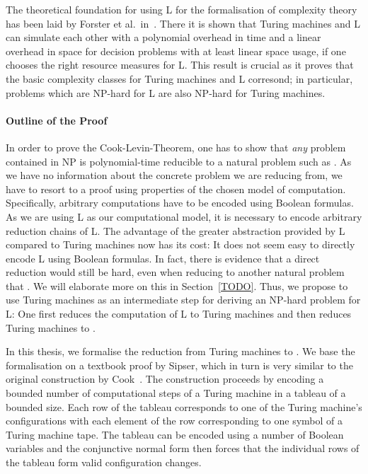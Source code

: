 The theoretical foundation for using L for the formalisation of complexity theory has been laid by Forster et al.\ in~\cite{TODO}. There it is shown that Turing machines and L can simulate each other with a polynomial overhead in time and a linear overhead in space for decision problems with at least linear space usage, if one chooses the right resource measures for L.
This result is crucial as it proves that the basic complexity classes for Turing machines and L corresond; in particular, problems which are NP-hard for L are also NP-hard for Turing machines.

\paragraph{Outline of the Proof}
In order to prove the Cook-Levin-Theorem, one has to show that \emph{any} problem contained in NP is polynomial-time reducible to a natural problem such as \SAT{}. 
As we have no information about the concrete problem we are reducing from, we have to resort to a proof using properties of the chosen model of computation. 
Specifically, arbitrary computations have to be encoded using Boolean formulas.
As we are using L as our computational model, it is necessary to encode arbitrary reduction chains of L. The advantage of the greater abstraction provided by L compared to Turing machines now has its cost: It does not seem easy to directly encode L using Boolean formulas. In fact, there is evidence that a direct reduction would still be hard, even when reducing to another natural problem that \SAT{}. We will elaborate more on this in Section~\ref{TODO}.
Thus, we propose to use Turing machines as an intermediate step for deriving an NP-hard problem for L: One first reduces the computation of L to Turing machines and then reduces Turing machines to \SAT{}. 

In this thesis, we formalise the reduction from Turing machines to \SAT{}. We base the formalisation on a textbook proof by Sipser\cite{TODO}, which in turn is very similar to the original construction by Cook~\cite{TODO}. The construction proceeds by encoding a bounded number of computational steps of a Turing machine in a tableau of a bounded size. Each row of the tableau corresponds to one of the Turing machine's configurations with each element of the row corresponding to one symbol of a Turing machine tape. The tableau can be encoded using a number of Boolean variables and the conjunctive normal form then forces that the individual rows of the tableau form valid configuration changes.


